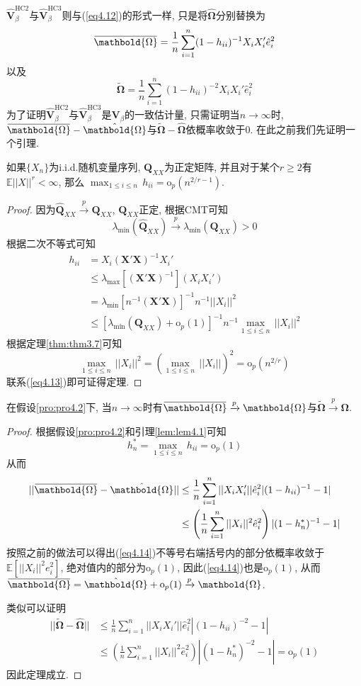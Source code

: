 \documentclass[cn, 12pt, math=mtpro2, bibstyle=apa, blue, twocol]{elegantbook}
\newcommand{\E}{\mathbb{E}}
\newcommand{\Q}{\mathbold{Q}}
\newcommand{\X}{\mathbold{X}}
\newcommand{\V}{\mathbold{V}}
\newcommand{\Om}{\mathbold{\Omega}}
\newcommand{\overbar}[1]{\mkern 1.5mu\overline{\mkern-1.5mu#1\mkern-1.5mu}\mkern 1.5mu}
\begin{document}
$\hat{\V}_\beta^{\text{HC2}}$与$\hat{\V}_\beta^{\text{HC3}}$则与(\ref{eq4.12})的形式一样, 只是将$\hat{\mathbold{\Omega}}$分别替换为
$$\overbar{\mathbold{\Omega}}=\frac{1}{n}\sum_{i=1}^{n}(1-h_{ii})^{-1}X_iX_i'\hat{e}_i^2$$
以及
$$\tilde{\mathbold{\Omega}}=\frac{1}{n}\sum_{i=1}^{n}(1-h_{ii})^{-2}X_iX_i'\hat{e}_i^2$$
为了证明$\hat{\V}_\beta^{\text{HC2}}$与$\hat{\V}_\beta^{\text{HC3}}$是$\V_\beta$的一致估计量, 只需证明当$n\to\infty$时, $\overbar{\mathbold{\Omega}}-\hat{\mathbold{\Omega}}$与$\tilde{\mathbold{\Omega}}-\hat{\mathbold{\Omega}}$依概率收敛于0. 在此之前我们先证明一个引理.
\begin{lemma}\label{lem:lem4.1}
如果$\{X_n\}$为i.i.d.随机变量序列, $\Q_{XX}$为正定矩阵, 并且对于某个$r\ge2$有$\E||X||^r<\infty$, 那么
$\displaystyle\max_{1\leq i\leq n}\,h_{ii}=\text{o}_p(n^{2/r-1})$.
\end{lemma}
\begin{proof}
  因为$\hat{\Q}_{XX}\xrightarrow{p}\Q_{XX}$, $\Q_{XX}$正定, 根据CMT可知
  $$\lambda_{\min}(\hat{\Q}_{XX})\xrightarrow{p}\lambda_{\min}(\Q_{XX})>0$$
  根据二次不等式可知
  \begin{align}
  h_{ii}&=X_i(\X'\X)^{-1}X_i' \nonumber \\
  &\leq\lambda_{\max}[(\X'\X)^{-1}](X_iX_i') \nonumber \\
  &=\lambda_{\min}[n^{-1}(\X'\X)]^{-1}n^{-1}||X_i||^2 \nonumber \\
  &\leq[\lambda_{\min}(\Q_{XX})+\text{o}_p(1)]^{-1}n^{-1}\max_{1\leq i\leq n}\,||X_i||^2 \label{eq4.13}
  \end{align}
  根据定理\ref{thm:thm3.7}可知
  $$\max_{1\leq i\leq n}\,||X_i||^2=\left(\max_{1\leq i\leq n}\,||X_i||\right)^2=\text{o}_p(n^{2/r})$$
  联系(\ref{eq4.13})即可证得定理.
\end{proof}
\begin{theorem}
  在假设\ref{pro:pro4.2}下, 当$n\to\infty$时有$\overbar{\mathbold{\Omega}}\xrightarrow{p}\mathbold{\Omega}$与$\tilde{\mathbold{\Omega}}\xrightarrow{p}\mathbold{\Omega}$.
\end{theorem}
\begin{proof}
  根据假设\ref{pro:pro4.2}和引理\ref{lem:lem4.1}可知
  $$h^\ast_n=\max_{1\leq i\leq n}\,h_{ii}=\text{o}_p(1)$$
  从而
  \begin{align}
  ||\overbar{\Om}-\hat{\Om}||&\leq\frac{1}{n}\sum_{i=1}^{n}||X_iX_i'||\hat{e}_i^2|(1-h_{ii})^{-1}-1| \nonumber\\
  &\leq\left(\frac{1}{n}\sum_{i=1}^{n}||X_i||^2\hat{e}_i^2\right)|(1-h_n^\ast)^{-1}-1| \label{eq4.14}
  \end{align}
  按照之前的做法可以得出(\ref{eq4.14})不等号右端括号内的部分依概率收敛于$\E[||X_i||^2e^2_i]$, 绝对值内的部分为$\text{o}_p(1)$, 因此(\ref{eq4.14})也是$\text{o}_p(1)$, 从而$\overbar{\Om}=\hat{\Om}+\text{o}_p(1)\xrightarrow{p}\Om$.

  类似可以证明
  \begin{align*}
  ||\tilde{\Om}-\hat{\Om}||&\leq\frac{1}{n}\sum_{i=1}^{n}||X_iX_i'||\hat{e}_i^2|(1-h_{ii})^{-2}-1|\\
  &\leq\left(\frac{1}{n}\sum_{i=1}^{n}||X_i||^2\hat{e}_i^2\right)|(1-h_n^\ast)^{-2}-1|=\text{o}_p(1)
  \end{align*}
  因此定理成立.
\end{proof}
\end{document}
